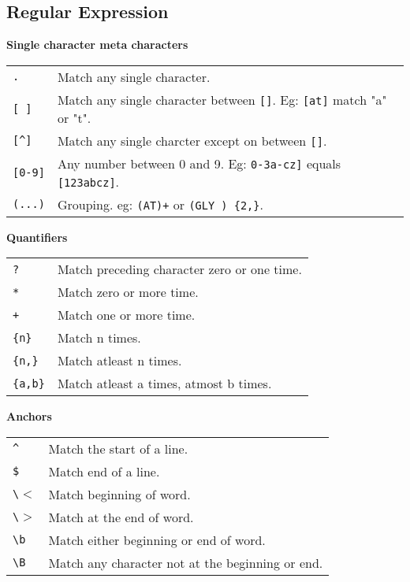 

\subsection{Regular Expression}

\textbf{Single character meta characters}
\begin{tabularx}{\linewidth}{lX}
    \texttt{.} & Match any single character.\\
    \texttt{[ ]} & Match any single character between \texttt{[]}. Eg: \texttt{[at]} match "a" or "t".\\
    \texttt{[\^{}]} & Match any single charcter except on between \texttt{[]}.\\
    \texttt{[0-9]} & Any number between 0 and 9. Eg: \texttt{0-3a-cz]} equals \texttt{[123abcz]}.\\
    \texttt{(...)} & Grouping. eg: \texttt{(AT)+} or \texttt{(GLY ) \{2,\}}.\\
    \hline
\end{tabularx}


\textbf{Quantifiers}
\begin{tabularx}{\linewidth}{lX}
    \texttt{?} & Match preceding character zero or one time. \\
    \texttt{*} & Match zero or more time.\\
    \texttt{+} & Match one or more time.\\
    \texttt{\{n\}} & Match n times.\\
    \texttt{\{n,\}} & Match atleast n times.\\
    \texttt{\{a,b\}} & Match atleast a times, atmost b times.\\
    \hline
\end{tabularx}

\textbf{Anchors}

\begin{tabularx}{\linewidth}{lX}
    \texttt{\^{}} & Match the start of a line.\\
    \texttt{\$} & Match end of a line.\\
    \texttt{\textbackslash $<$} & Match beginning of word.\\
    \texttt{\textbackslash $>$} & Match at the end of word.\\
    \texttt{\textbackslash b} & Match either beginning or end of word.\\
    \texttt{\textbackslash B} & Match any character not at the beginning or end. \\
    \hline
\end{tabularx}

